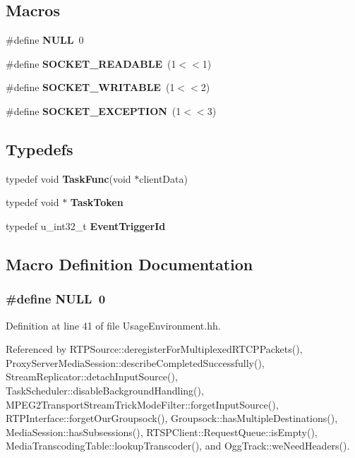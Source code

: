 \subsection*{Macros}
\begin{DoxyCompactItemize}
\item 
\#define {\bf N\+U\+L\+L}~0
\item 
\#define {\bf S\+O\+C\+K\+E\+T\+\_\+\+R\+E\+A\+D\+A\+B\+L\+E}~(1$<$$<$1)
\item 
\#define {\bf S\+O\+C\+K\+E\+T\+\_\+\+W\+R\+I\+T\+A\+B\+L\+E}~(1$<$$<$2)
\item 
\#define {\bf S\+O\+C\+K\+E\+T\+\_\+\+E\+X\+C\+E\+P\+T\+I\+O\+N}~(1$<$$<$3)
\end{DoxyCompactItemize}
\subsection*{Typedefs}
\begin{DoxyCompactItemize}
\item 
typedef void {\bf Task\+Func}(void $\ast$client\+Data)
\item 
typedef void $\ast$ {\bf Task\+Token}
\item 
typedef u\+\_\+int32\+\_\+t {\bf Event\+Trigger\+Id}
\end{DoxyCompactItemize}


\subsection{Macro Definition Documentation}
\subsubsection[{N\+U\+L\+L}]{\setlength{\rightskip}{0pt plus 5cm}\#define N\+U\+L\+L~0}\label{UsageEnvironment_8hh_a070d2ce7b6bb7e5c05602aa8c308d0c4}


Definition at line 41 of file Usage\+Environment.\+hh.



Referenced by R\+T\+P\+Source\+::deregister\+For\+Multiplexed\+R\+T\+C\+P\+Packets(), Proxy\+Server\+Media\+Session\+::describe\+Completed\+Successfully(), Stream\+Replicator\+::detach\+Input\+Source(), Task\+Scheduler\+::disable\+Background\+Handling(), M\+P\+E\+G2\+Transport\+Stream\+Trick\+Mode\+Filter\+::forget\+Input\+Source(), R\+T\+P\+Interface\+::forget\+Our\+Groupsock(), Groupsock\+::has\+Multiple\+Destinations(), Media\+Session\+::has\+Subsessions(), R\+T\+S\+P\+Client\+::\+Request\+Queue\+::is\+Empty(), Media\+Transcoding\+Table\+::lookup\+Transcoder(), and Ogg\+Track\+::we\+Need\+Headers().

